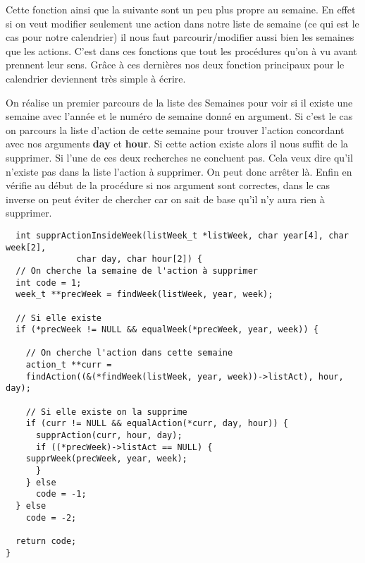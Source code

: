 \documentclass[11pt]{article}
\begin{document}
\begin{enumerate}
Cette fonction ainsi que la suivante sont un peu plus propre au semaine. En
effet si on veut modifier seulement une action dans notre liste de semaine
(ce qui est le cas pour notre calendrier) il nous faut parcourir/modifier
aussi bien les semaines que les actions.
C'est dans ces fonctions que tout les procédures qu'on à vu avant prennent
leur sens. Grâce à ces dernières nos deux fonction principaux pour le
calendrier deviennent très simple à écrire.

On réalise un premier parcours de la liste des Semaines pour voir si il
existe une semaine avec l'année et le numéro de semaine donné en
argument. Si c'est le cas on parcours la liste d'action de cette semaine
pour trouver l'action concordant avec nos arguments \textbf{day} et \textbf{hour}. Si
cette action existe alors il nous suffit de la supprimer. Si l'une de ces
deux recherches ne concluent pas. Cela veux dire qu'il n'existe pas dans la
liste l'action à supprimer. On peut donc arrêter là. Enfin en vérifie au
début de la procédure si nos argument sont correctes, dans le cas inverse
on peut éviter de chercher car on sait de base qu'il n'y aura rien à
supprimer.

\begin{lstlisting}
  int supprActionInsideWeek(listWeek_t *listWeek, char year[4], char week[2],
			  char day, char hour[2]) {
  // On cherche la semaine de l'action à supprimer
  int code = 1;
  week_t **precWeek = findWeek(listWeek, year, week);

  // Si elle existe
  if (*precWeek != NULL && equalWeek(*precWeek, year, week)) {

    // On cherche l'action dans cette semaine
    action_t **curr =
	findAction((&(*findWeek(listWeek, year, week))->listAct), hour, day);

    // Si elle existe on la supprime
    if (curr != NULL && equalAction(*curr, day, hour)) {
      supprAction(curr, hour, day);
      if ((*precWeek)->listAct == NULL) {
	supprWeek(precWeek, year, week);
      }
    } else
      code = -1;
  } else
    code = -2;

  return code;
}
\end{lstlisting}



\end{enumerate}
\end{document}
